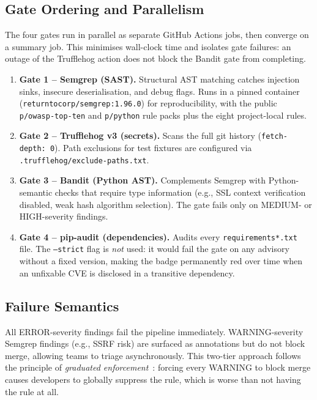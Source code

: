 \documentclass[conference]{IEEEtran}
\begin{document}
\subsection{Gate Ordering and Parallelism}

The four gates run in parallel as separate GitHub Actions jobs, then
converge on a summary job. This minimises wall-clock time and isolates
gate failures: an outage of the Trufflehog action does not block the
Bandit gate from completing.

\begin{enumerate}
  \item \textbf{Gate 1 -- Semgrep (SAST).} Structural AST matching catches
        injection sinks, insecure deserialisation, and debug flags. Runs
        in a pinned container (\texttt{returntocorp/semgrep:1.96.0}) for
        reproducibility, with the public \texttt{p/owasp-top-ten} and
        \texttt{p/python} rule packs plus the eight project-local rules.
  \item \textbf{Gate 2 -- Trufflehog v3 (secrets).} Scans the full git
        history (\texttt{fetch-depth: 0}). Path exclusions for test
        fixtures are configured via \texttt{.trufflehog/exclude-paths.txt}.
  \item \textbf{Gate 3 -- Bandit (Python AST).} Complements Semgrep with
        Python-semantic checks that require type information (e.g., SSL
        context verification disabled, weak hash algorithm selection).
        The gate fails only on MEDIUM- or HIGH-severity findings.
  \item \textbf{Gate 4 -- pip-audit (dependencies).} Audits every
        \texttt{requirements*.txt} file. The \texttt{--strict} flag is
        \emph{not} used: it would fail the gate on any advisory without a
        fixed version, making the badge permanently red over time when an
        unfixable CVE is disclosed in a transitive dependency.
\end{enumerate}

\subsection{Failure Semantics}

All ERROR-severity findings fail the pipeline immediately. WARNING-severity
Semgrep findings (e.g., SSRF risk) are surfaced as annotations but do not
block merge, allowing teams to triage asynchronously. This two-tier approach
follows the principle of \emph{graduated enforcement}~\cite{morrison2018}:
forcing every WARNING to block merge causes developers to globally suppress
the rule, which is worse than not having the rule at all.
\end{document}
